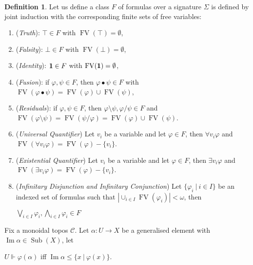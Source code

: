 \documentclass[8pt]{article}
\theoremstyle{definition}
\newtheorem{definition}{Definition}[section]
\theoremstyle{definition}
\theoremstyle{definition}
\theoremstyle{definition}
\theoremstyle{definition}
\theoremstyle{definition}
\theoremstyle{definition}
\theoremstyle{definition}
\theoremstyle{definition}
\theoremstyle{definition}
\theoremstyle{definition}
\theoremstyle{definition}
\theoremstyle{definition}
\theoremstyle{question}
\begin{document}
\begin{definition}
  Let us define a class $F$ of formulas over a signature $\Sigma$ is defined by joint induction
  with the corresponding finite sets of free variables:
  \begin{enumerate}
    \item (\emph{Truth}): $\top \in F$ with $\operatorname{FV}(\top) = \emptyset$,
    \item (\emph{Falsity}): $\bot \in F$ with $\operatorname{FV}(\bot) = \emptyset$,
    \item (\emph{Identity}): ${\bf 1} \in F$ with $\operatorname{FV}({\bf 1}) = \emptyset$,
    \item (\emph{Fusion}): if $\varphi, \psi \in F$, then $\varphi \bullet \psi \in F$ with 
    $\operatorname{FV}(\varphi \bullet \psi) = \operatorname{FV}(\varphi) \cup \operatorname{FV}(\psi)$,
    \item (\emph{Residuals}): if $\varphi, \psi \in F$, then $\varphi \setminus \psi, \varphi / \psi \in F$ and
    $\operatorname{FV}(\varphi \setminus \psi) = \operatorname{FV}(\psi / \varphi) = \operatorname{FV}(\varphi) \cup \operatorname{FV}(\psi)$.
    \item (\emph{Universal Quantifier}) Let $v_i$ be a variable and let $\varphi \in F$, then $\forall v_i \varphi$
    and $\operatorname{FV}(\forall v_i \varphi) = \operatorname{FV}(\varphi) - \{v_i\}$.
    \item (\emph{Existential Quantifier}) Let $v_i$ be a variable and let $\varphi \in F$, then $\exists v_i \varphi$
    and $\operatorname{FV}(\exists v_i \varphi) = \operatorname{FV}(\varphi) - \{v_i\}$.
    \item (\emph{Infinitary Disjunction and Infinitary Conjunction})
    Let $\{ \varphi_i \: | \: i \in I \}$ be an indexed set of formulas such that 
    $|\cup_{i \in I} \operatorname{FV}(\varphi_i)| < \omega$, then
    \begin{center}
      $\bigvee \limits_{i \in I} \varphi_i, \bigwedge \limits_{i \in I} \varphi_i \in F$
    \end{center}
  \end{enumerate}
\end{definition}

Fix a monoidal topos $\mathcal{C}$. Let $\alpha : U \to X$ be a generalised element with 
$\operatorname{Im}\alpha \in \operatorname{Sub}(X)$, let
\begin{center}
  $U \Vdash \varphi(\alpha)$ iff $\operatorname{Im}\alpha \leq \{ x \: | \: \varphi(x) \}$.
\end{center}
\end{document}

